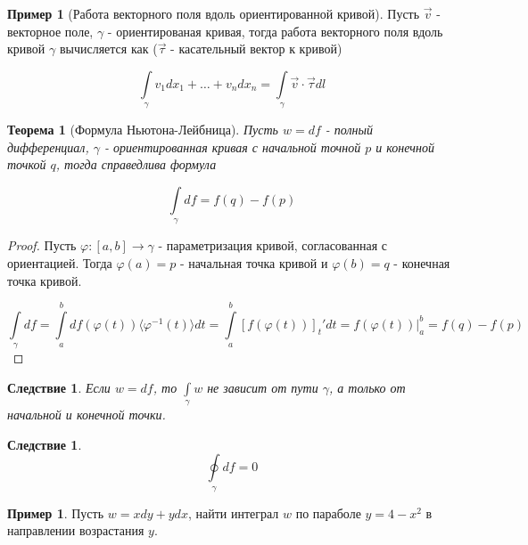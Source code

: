 \documentclass[a5paper]{article}
\newcounter{through}
\theoremstyle{plain}
\newtheorem{theorem}[through]{Теорема}
\newtheorem{corollary}[through]{Следствие}
\theoremstyle{definition}
\newtheorem{example}[through]{Пример}
\numberwithin{through}{section}
\numberwithin{equation}{section}
\begin{document}
\begin{example}[Работа векторного поля вдоль ориентированной кривой]
	Пусть $\vec{v}$ - векторное поле, $\gamma$ - ориентированая кривая, тогда работа векторного поля вдоль кривой $\gamma$ вычисляется как ($\vec{\tau}$ - касательный вектор к кривой)
	
	\begin{equation*}
		\int\limits_{\gamma} v_1 dx_1 + \ldots + v_n dx_n = \int\limits_{\gamma} \vec{v} \cdot \vec{\tau} dl
	\end{equation*}
\end{example}

\begin{theorem}[Формула Ньютона-Лейбница]
	Пусть $w=df$ - полный дифференциал, $\gamma$ - ориентированная кривая с начальной точной $p$ и конечной точкой $q$, тогда справедлива формула
	
	\begin{equation*}
		\int\limits_{\gamma} df = f(q) - f(p)
	\end{equation*}
\end{theorem}

\begin{proof}
	Пусть $\varphi : [a, b] \to \gamma$ - параметризация кривой, согласованная с ориентацией. Тогда $\varphi(a) = p$ - начальная точка кривой и $\varphi(b) = q$ - конечная точка кривой.
	
	\begin{equation*}
		\int\limits_{\gamma} df = \int\limits_{a}^{b} df(\varphi(t)) \langle \varphi^{-1}(t) \rangle dt = \int\limits_{a}^{b} [f(\varphi(t))]_t'dt = f(\varphi(t)) \bigg|_{a}^{b}=f(q) - f(p)
	\end{equation*}
\end{proof}

\begin{corollary}
	Если $w=df$, то $\int\limits_{\gamma} w$ не зависит от пути $\gamma$, а только от начальной и конечной точки.
\end{corollary}

\begin{corollary} \label{ClosedLoopInt}
	\begin{equation*}
		\oint\limits_{\gamma} df = 0
	\end{equation*}
\end{corollary}

\begin{example}
	Пусть $w = xdy + ydx$, найти интеграл $w$ по параболе $y = 4 - x^2$ в направлении возрастания $y$. 
\end{example}
\end{document}

